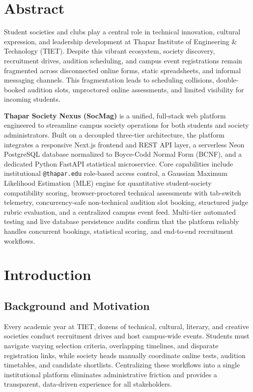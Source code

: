 \documentclass[12pt,a4paper]{report}
\begin{document}
\chapter*{Abstract}

Student societies and clubs play a central role in technical innovation, cultural expression, and leadership development at Thapar Institute of Engineering \& Technology (TIET). Despite this vibrant ecosystem, society discovery, recruitment drives, audition scheduling, and campus event registrations remain fragmented across disconnected online forms, static spreadsheets, and informal messaging channels. This fragmentation leads to scheduling collisions, double-booked audition slots, unproctored online assessments, and limited visibility for incoming students.

\textbf{Thapar Society Nexus (SocMag)} is a unified, full-stack web platform engineered to streamline campus society operations for both students and society administrators. Built on a decoupled three-tier architecture, the platform integrates a responsive Next.js frontend and REST API layer, a serverless Neon PostgreSQL database normalized to Boyce-Codd Normal Form (BCNF), and a dedicated Python FastAPI statistical microservice. Core capabilities include institutional \texttt{@thapar.edu} role-based access control, a Gaussian Maximum Likelihood Estimation (MLE) engine for quantitative student-society compatibility scoring, browser-proctored technical assessments with tab-switch telemetry, concurrency-safe non-technical audition slot booking, structured judge rubric evaluation, and a centralized campus event feed. Multi-tier automated testing and live database persistence audits confirm that the platform reliably handles concurrent bookings, statistical scoring, and end-to-end recruitment workflows.

\tableofcontents
\listoftables
\newpage
{}

\chapter{Introduction}

\section{Background and Motivation}
Every academic year at TIET, dozens of technical, cultural, literary, and creative societies conduct recruitment drives and host campus-wide events. Students must navigate varying selection criteria, overlapping timelines, and disparate registration links, while society heads manually coordinate online tests, audition timetables, and candidate shortlists. Centralizing these workflows into a single institutional platform eliminates administrative friction and provides a transparent, data-driven experience for all stakeholders.
\end{document}

